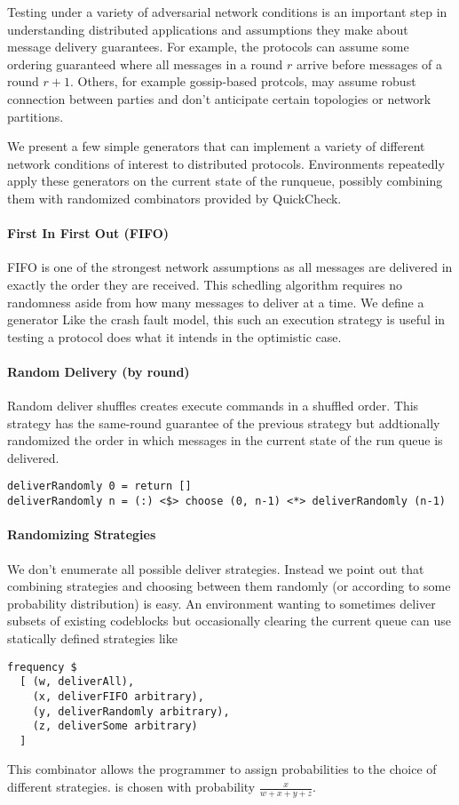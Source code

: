 Testing under a variety of adversarial network conditions is an important step in understanding distributed applications and assumptions they make about message delivery guarantees.
For example, the protocols can assume some ordering guaranteed where all messages in a round $r$ arrive before messages of a round $r+1$. 
Others, for example gossip-based protcols, may assume robust connection between parties and don't anticipate certain topologies or network partitions.

We present a few simple generators that can implement a variety of different network conditions of interest to distributed protocols.
Environments repeatedly apply these generators on the current state of the runqueue, possibly combining them with randomized combinators provided by QuickCheck. 

\paragraph{First In First Out (FIFO)}
FIFO is one of the strongest network assumptions as all messages are delivered in exactly the order they are received. 
This schedling algorithm requires no randomness aside from how many messages to deliver at a time.
We define a generator 
Like the crash fault model, this such an execution strategy is useful in testing a protocol does what it intends in the optimistic case.

\paragraph{Random Delivery (by round)}
Random deliver shuffles creates execute commands in a shuffled order.
This strategy has the same-round guarantee of the previous strategy but addtionally randomized the order
in which messages in the current state of the run queue is delivered.
\begin{lstlisting}
deliverRandomly 0 = return []
deliverRandomly n = (:) <$> choose (0, n-1) <*> deliverRandomly (n-1)
\end{lstlisting}

\paragraph{Randomizing Strategies}
We don't enumerate all possible deliver strategies.
Instead we point out that combining strategies and choosing between them randomly (or according to some probability distribution) is easy.
An environment wanting to sometimes deliver subsets of existing codeblocks but occasionally clearing the current queue can use statically defined strategies like
\begin{lstlisting}
frequency $ 
  [ (w, deliverAll), 
    (x, deliverFIFO arbitrary),
    (y, deliverRandomly arbitrary),
    (z, deliverSome arbitrary)
  ]
\end{lstlisting} 
This combinator allows the programmer to assign probabilities to the choice of different strategies.
 is chosen with probability $\frac{x}{w+x+y+z}$.

